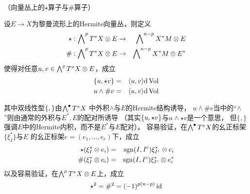 
\begin{definition}（向量丛上的$\star$算子与$\#$算子）

设$E\to X$为黎曼流形上的Hermite向量丛，则定义
\begin{eqnarray*}
\star :\bigwedge\nolimits^{p}T^*X\otimes E&\to&\bigwedge\nolimits^{n-p}X^*M\otimes E \\
\#    :\bigwedge\nolimits^{p}T^*X\otimes E&\to&\bigwedge\nolimits^{n-p}X^*M\otimes E^*
\end{eqnarray*}
使得对任意$u,v\in \bigwedge\nolimits^{p}T^*X\otimes E$，成立
\begin{eqnarray*}
\{ u,\star v \}&=&\langle u,v \rangle\mathrm{d}\operatorname{Vol}\\
u\wedge\# v      &=&\langle u,v \rangle\mathrm{d}\operatorname{Vol}
\end{eqnarray*}
\end{definition}

其中双线性型$\{ , \}$由$\bigwedge\nolimits^{\bullet}T^*X$
中外积$\wedge$与$E$的Hermite结构诱导，
$u\wedge\# v$当中的“$\wedge$”则由通常的外积与$E^*,E$的配对所诱导
（其实$\{ u,\star v \}$与$u\wedge\star v$是一个意思，
但$\{,\}$强调$E$中的Hermite内积，而不是$E^*$与$E$配对）。
容易验证，在$\bigwedge\nolimits^{\bullet}T^*X$的幺正标架$\{\xi_I^*\}$与$E$
的幺正标架$e=(e_1,...,e_r)$下，成立
\begin{eqnarray*}
  \star (\xi_I^*\otimes e_i) &=& \operatorname{sgn}(I,I^c)\xi_{I^c}^*\otimes e_i\\
  \#    (\xi_I^*\otimes e_i) &=& \operatorname{sgn}(I,I^c)\xi_{I^c}^*\otimes e_i^*
\end{eqnarray*}
以及容易验证，在$\bigwedge\nolimits^{p}T^*X\otimes E$上，成立
$$
  \star^2=\#^2=(-1)^{p(n-p)}\operatorname{id}
$$


